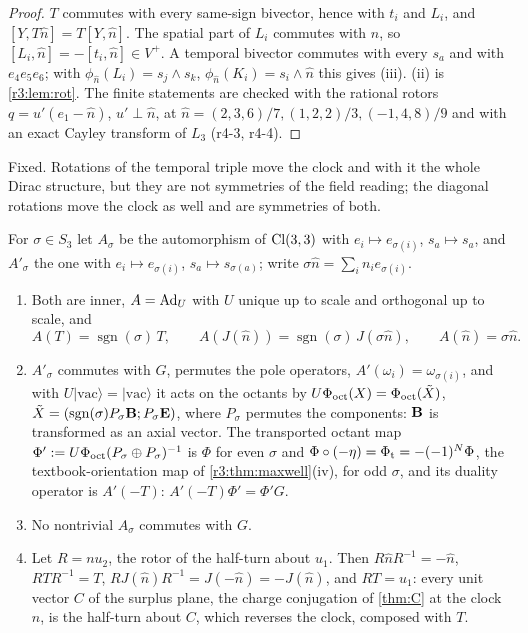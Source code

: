 \begin{proof}
$T$ commutes with every same-sign bivector, hence with $t_i$ and $L_i$, and $[Y,T\hat n]=T[Y,\hat n]$. The spatial part of $L_i$ commutes with $\hat n$, so
$[L_i,\hat n]=-[t_i,\hat n]\in V^+$. A temporal bivector commutes with every $s_a$ and with $e_4e_5e_6$; with $\phi_{\hat n}(L_i)=s_j\wedge s_k$, $\phi_{\hat n}(K_i)=s_i\wedge \hat n$ this
gives (iii). (ii) is \cref{r3:lem:rot}. The finite statements are checked with the rational rotors $q=u'(e_1-\hat n)$, $u'\perp \hat n$, at
$\hat n=(2,3,6)/7,(1,2,2)/3,(-1,4,8)/9$ and with an exact Cayley transform of $L_3$ (r4-3, r4-4).
\end{proof}

Fixed. Rotations of the temporal triple move the clock and with it the whole Dirac structure, but they are not symmetries of the field reading;
the diagonal rotations move the clock as well and are symmetries of both.

\begin{proposition}
\label{r4:prop:perm}
For $\sigma\in S_3$ let $A_\sigma$ be the automorphism of $\mathrm{Cl}(3,3)$ with $e_i\mapsto e_{\sigma(i)}$, $s_a\mapsto s_a$, and $A'_\sigma$ the one with
$e_i\mapsto e_{\sigma(i)}$, $s_a\mapsto s_{\sigma(a)}$; write $\sigma \hat n=\sum_in_ie_{\sigma(i)}$.
\begin{enumerate}[label=(\roman*),leftmargin=2.2em]
\item Both are inner, $A=\operatorname{Ad}_U$ with $U$ unique up to scale and orthogonal up to scale, and
\[
A(T)=\operatorname{sgn}(\sigma)\,T,\qquad A(J(\hat n))=\operatorname{sgn}(\sigma)\,J(\sigma \hat n),\qquad A(\hat n)=\sigma \hat n .
\]
\item $A'_\sigma$ commutes with $G$, permutes the pole operators, $A'(\omega_i)=\omega_{\sigma(i)}$, and with $U|\mathrm{vac}\rangle=|\mathrm{vac}\rangle$ it acts on
the octants by $U\Phi_{\rm oct}(X)=\Phi_{\rm oct}(\tilde X)$, $\tilde X=(\operatorname{sgn}(\sigma)P_\sigma\mathbf B;P_\sigma\mathbf E)$, where $P_\sigma$ permutes the components: $\mathbf B$ is
transformed as an axial vector. The transported octant map $\Phi':=U\Phi_{\rm oct}(P_\sigma\oplus P_\sigma)^{-1}$ is $\Phi$ for even $\sigma$ and
$\Phi\circ(-\eta)=\Phi_{\rm t}=-(-1)^N\Phi$, the textbook-orientation map of \cref{r3:thm:maxwell}(iv), for odd $\sigma$, and its duality operator is
$A'(-T)$: $A'(-T)\Phi'=\Phi'G$.
\item No nontrivial $A_\sigma$ commutes with $G$.
\item Let $R=nu_2$, the rotor of the half-turn about $u_1$. Then $R\hat nR^{-1}=-\hat n$, $RTR^{-1}=T$, $RJ(\hat n)R^{-1}=J(-\hat n)=-J(\hat n)$, and $RT=u_1$: every unit vector
$C$ of the surplus plane, the charge conjugation of \cref{thm:C} at the clock $\hat n$, is the half-turn about $C$, which reverses the
clock, composed with $T$.
\end{enumerate}
\end{proposition}


